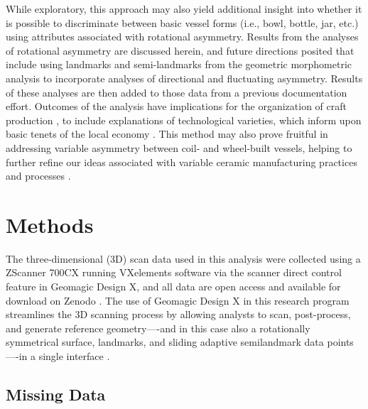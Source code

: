 \documentclass[preprint,12pt]{elsarticle}
\begin{document}
While exploratory, this approach may also yield additional insight into whether it is possible to discriminate between basic vessel forms (i.e., bowl, bottle, jar, etc.) using attributes associated with rotational asymmetry. Results from the analyses of rotational asymmetry are discussed herein, and future directions posited that include using landmarks and semi-landmarks from the geometric morphometric analysis to incorporate analyses of directional and fluctuating asymmetry. Results of these analyses are then added to those data from a previous documentation effort. Outcomes of the analysis have implications for the organization of craft production \citep{Costin:2}, to include explanations of technological varieties, which inform upon basic tenets of the local economy \citep{Costin:1}. This method may also prove fruitful in addressing variable asymmetry between coil- and wheel-built vessels, helping to further refine our ideas associated with variable ceramic manufacturing practices and processes \citep{Sinopoli:1}.

\section{Methods}

The three-dimensional (3D) scan data used in this analysis were collected using a ZScanner 700CX running VXelements software via the scanner direct control feature in Geomagic Design X, and all data are open access and available for download on Zenodo \cite{selden:19, Selden:18, Selden:17, Selden:16, Selden:15, Selden:14, Selden:13, Selden:12, Selden:11, Selden:10}. The use of Geomagic Design X in this research program streamlines the 3D scanning process by allowing analysts to scan, post-process, and generate reference geometry—-and in this case also a rotationally symmetrical surface, landmarks, and sliding adaptive semilandmark data points—-in a single interface \cite{Selden:20}. 

\subsection{Missing Data}
\end{document}
